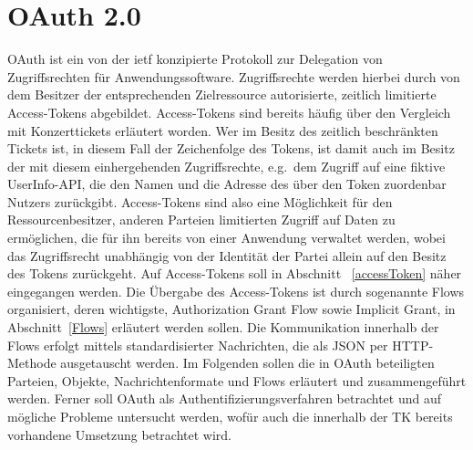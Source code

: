 \chapter{OAuth 2.0} \gls{OAuth} ist ein von der \gls{ietf} konzipierte Protokoll
zur Delegation von Zugriffsrechten für Anwendungssoftware. Zugriffsrechte werden
hierbei durch von dem Besitzer der entsprechenden Zielressource autorisierte,
zeitlich limitierte Access-Tokens abgebildet. Access-Tokens sind bereits häufig
über den Vergleich mit Konzerttickets erläutert worden. Wer im Besitz des
zeitlich beschränkten Tickets ist, in diesem Fall der Zeichenfolge des Tokens,
ist damit auch im Besitz der mit diesem einhergehenden Zugriffsrechte, e.g.\ dem
Zugriff auf eine fiktive UserInfo-API, die den Namen und die Adresse des über
den Token zuordenbar Nutzers zurückgibt. Access-Tokens sind also eine
Möglichkeit für den Ressourcenbesitzer, anderen Parteien limitierten Zugriff auf
Daten zu ermöglichen, die für ihn bereits von einer Anwendung verwaltet werden,
wobei das Zugriffsrecht unabhängig von der Identität der Partei allein auf den
Besitz des Tokens zurückgeht. Auf Access-Tokens soll in Abschnitt
~\ref{accessToken} näher eingegangen werden. Die Übergabe des Access-Tokens ist
durch sogenannte Flows organisiert, deren wichtigste, Authorization Grant Flow
sowie Implicit Grant, in Abschnitt~\ref{Flows} erläutert werden sollen. Die
Kommunikation innerhalb der Flows erfolgt mittels standardisierter Nachrichten,
die als JSON per HTTP-Methode ausgetauscht werden. Im Folgenden sollen die in
\gls{OAuth} beteiligten Parteien, Objekte, Nachrichtenformate und Flows
erläutert und zusammengeführt werden. Ferner soll \gls{OAuth} als
Authentifizierungsverfahren betrachtet und auf mögliche Probleme untersucht
werden, wofür auch die innerhalb der TK bereits vorhandene Umsetzung
betrachtet wird.






